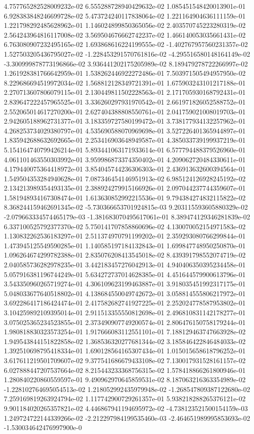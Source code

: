 4.757765282528009232e-02	6.555288728940429632e-02	1.085451548420013901e-01	6.928383848246699728e-02	5.473724240117838064e-02	1.221164904636111159e-01	1.221798292485628962e-01	1.146024899850365056e-02	2.403570745223280319e-02	2.564243964816117008e-02	3.569504676662742237e-02	1.466140053035661431e-02	6.763080907232495165e-02	1.693868616224199555e-02	-1.402767957560231357e-02	1.527503205436795027e-02	-1.228453291570761816e-02	-4.295516580148164149e-02	-3.300999878773196866e-02	3.936441202175205989e-02	8.189479278722266997e-02	1.261928381766642959e-01	1.538262446922272486e-01	7.503971505494957950e-02	8.229686694519972034e-02	1.568812128349721391e-01	1.675903243101217188e-01	2.270713607806079115e-01	2.130449811502228563e-01	2.171705930168792431e-01	2.839647222457965525e-01	3.336260297931970542e-01	2.661971826052588752e-01	2.552065014617270200e-01	2.627404388808550761e-01	2.041759021008019703e-01	2.942605188962731377e-01	3.183359727580199472e-01	3.738177934132257962e-01	4.268253734029380797e-01	4.535690588070969698e-01	3.527226401365944897e-01	1.835942688632692665e-01	2.253416903648949587e-01	4.385033739199937219e-01	5.154164740799426214e-01	5.893441063171933614e-01	6.577794488379526960e-01	4.061101463550303992e-01	3.959986873374350402e-01	4.209062720484330611e-01	4.179440075364418972e-01	3.854045744236306303e-01	2.436913632600394564e-01	1.549504353284940628e-01	7.087346454146951913e-02	6.985124126928245192e-02	2.134213989354493135e-01	2.388924279915166926e-01	2.097044237744359607e-01	1.581948934167308474e-01	1.613630852992215536e-01	9.794384274832115822e-02	8.368244159462691345e-02	-5.730366653701924815e-03	9.203115593605880329e-02	-2.079663334574465179e-03	-1.381683070495617061e-01	8.389474129346281839e-02	6.337100525792377370e-02	5.750141707858860696e-02	4.130070052154971583e-02	1.130832262536183297e-01	2.511374970791199202e-01	2.359293080766299844e-01	1.473945125549590285e-01	1.140585197184132843e-01	1.699847748950250870e-01	1.096264674299782388e-01	2.835076208413545018e-02	8.439391798552074719e-02	2.040585736282978235e-01	3.442183457276042913e-01	4.940406350395234458e-01	5.057916381196744249e-01	5.634272737014628385e-01	4.451644579900613796e-01	3.543350960265719274e-01	4.306109623199463887e-01	3.918035451992317175e-01	5.048033677640518802e-01	4.138684550049742672e-01	3.058814555806217972e-01	3.692286417186424474e-01	2.417582682741927225e-01	2.252024778587953802e-01	3.104259892109395014e-01	2.911513355550812698e-01	2.496810831142178277e-01	3.075025365234523855e-01	2.373490907749200574e-01	2.806476150758179244e-01	1.980818830323573254e-01	1.917666083112551101e-01	7.188129463747663928e-02	1.949543844151822858e-02	1.368536320277681344e-02	3.185846422846484033e-02	1.392510698795418334e-01	1.690128564165307434e-01	1.015015658618796252e-01	3.617611219501709607e-02	9.377541686679433108e-02	7.130017931528161157e-02	6.027888447207537664e-02	8.215443233368756315e-02	1.578418866261800946e-01	1.280840220860559597e-01	9.490962970645859531e-02	8.187063216363354989e-02	-1.228102764695054513e-02	1.218052992435979948e-02	-1.268547809387122680e-02	7.259169819263924794e-02	1.117742900729261357e-01	5.938218288265376121e-02	9.901184020265357821e-02	4.446867941194695972e-02	-4.738123521500154159e-03	1.249724722144339266e-02	-2.212297984199535460e-03	-2.464651989995853693e-02	-1.530034642476997900e-0
